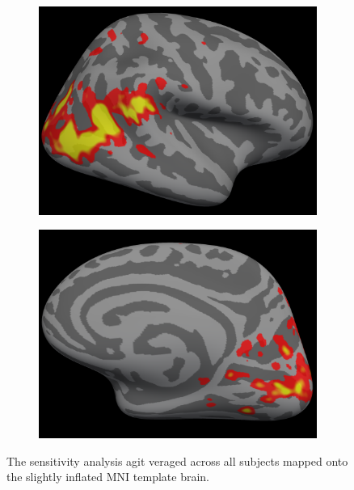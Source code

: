 \documentclass[preprint,5p,authoryear]{elsarticle}
\begin{document}
\begin{figure}
\begin{subfigure}{0.36\textwidth}
\includegraphics[width=\textwidth]{figures/rh-lateral-smax-average}
\caption{}
\label{fig:rh-lateral-smax-average}
\end{subfigure}
\begin{subfigure}{0.36\textwidth}
\centering
\includegraphics[width=\textwidth]{figures/rh-medial-smax-average}
\caption{}
\label{fig:rh-medial-smax-average}
\end{subfigure}
\caption{The sensitivity analysis agit veraged across all subjects mapped onto the slightly inflated MNI template brain.}
\label{fig:MNI-average-sensitivity}
\end{figure}
\end{document}
